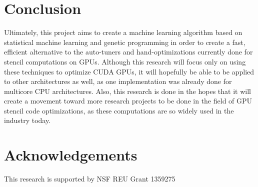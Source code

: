 \documentclass[conference]{IEEEtran}
\begin{document}



\section{Conclusion}
Ultimately, this project aims to create a machine learning algorithm based on statistical machine learning and genetic programming in order to create a fast, efficient alternative to the auto-tuners and hand-optimizations currently done for stencil computations on GPUs. Although this research will focus only on using these techniques to optimize CUDA GPUs, it will hopefully be able to be applied to other architectures as well, as one implementation was already done for multicore CPU architectures\cite{Datta}. Also, this research is done in the hopes that it will create a movement toward more research projects to be done in the field of GPU stencil code optimizations, as these computations are so widely used in the industry today.

\section{Acknowledgements}
This research is supported by NSF REU Grant 1359275

{ \vspace*{\columnsep} }










\end{document}
